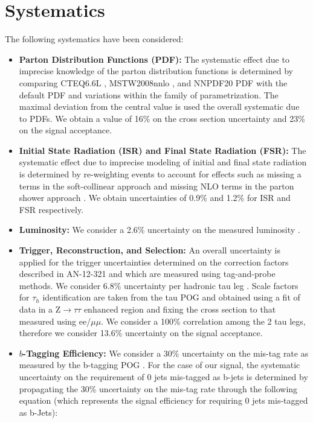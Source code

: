 \clearpage 
\section{Systematics}
\label{sec:systematics}

The following systematics have been considered:

\begin{itemize}
  \item \textbf{Parton Distribution Functions (PDF):} The systematic effect due to imprecise knowledge of the parton distribution functions is determined by comparing CTEQ6.6L \cite{Nadolsky:2008zw}, MSTW2008nnlo \cite{Martin:2009iq}, and NNPDF20 PDF \cite{Ubiali:2008uk} with the default PDF and variations within the family of parametrization. The maximal deviation from the central value is used the overall systematic due to PDFs. We obtain a value of 16\% on the cross section uncertainty and 23\% on the signal acceptance.

  \item \textbf{Initial State Radiation (ISR) and Final State Radiation (FSR):} The systematic effect due to imprecise modeling of initial and final state radiation is determined by re-weighting events to account for effects such as missing a terms in the soft-collinear approach \cite{Nanava:2003cg} and missing NLO terms in the parton shower approach \cite{Miu:1998ju}. We obtain uncertainties of 0.9\% and 1.2\% for ISR and FSR respectively.

  \item \textbf{Luminosity:} We consider a 2.6\% uncertainty on the measured luminosity \cite{CMS:2012rua}.
  
  \item \textbf{Trigger, Reconstruction, and Selection:}  An overall uncertainty is applied for the trigger uncertainties determined on the correction factors described in AN-12-321 and which are measured using tag-and-probe methods. We consider 6.8\% uncertainty per hadronic tau leg \cite{CMS:2011msa}. Scale factors for $\tau_{h}$ identification are taken from the tau POG and obtained using a fit of data in a Z$\to\tau\tau$ enhanced region and fixing the cross section to that measured using ee/$\mu\mu$. We consider a 100\% correlation among the 2 tau legs, therefore we consider 13.6\% uncertainty on the signal acceptance.

  \item \textbf{$b$-Tagging Efficiency:} We consider a 30\% uncertainty on the mis-tag rate as measured by the b-tagging POG \cite{CMS:2011cra}. For the case of our signal, the systematic uncertainty on the requirement of 0 jets mis-tagged as b-jets is determined by propagating the 30\% uncertainty on the mis-tag rate through the following equation (which represents the signal efficiency for requiring 0 jets mis-tagged as b-Jets):


\end{itemize}
